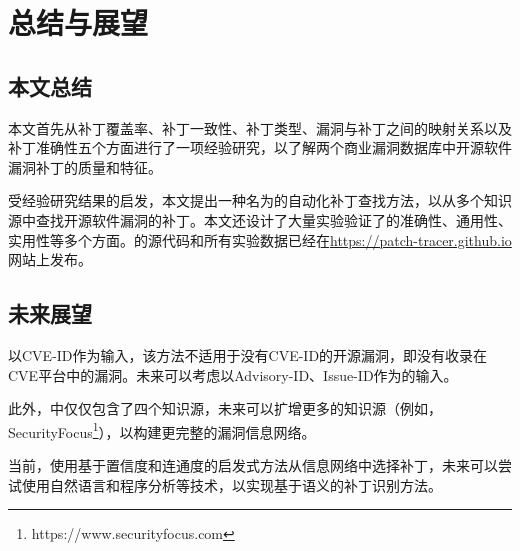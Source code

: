 \chapter{总结与展望}


\section{本文总结}
本文首先从补丁覆盖率、补丁一致性、补丁类型、漏洞与补丁之间的映射关系以及补丁准确性五个方面进行了一项经验研究，以了解两个商业漏洞数据库中开源软件漏洞补丁的质量和特征。

受经验研究结果的启发，本文提出一种名为\tool 的自动化补丁查找方法，以从多个知识源中查找开源软件漏洞的补丁。本文还设计了大量实验验证了\tool 的准确性、通用性、实用性等多个方面。\tool 的源代码和所有实验数据已经在\url{https://patch-tracer.github.io}网站上发布。

\section{未来展望}

\tool 以CVE-ID作为输入，该方法不适用于没有CVE-ID的开源漏洞，即没有收录在CVE平台中的漏洞。未来可以考虑以Advisory-ID、Issue-ID作为\tool 的输入。

此外，\tool 中仅仅包含了四个知识源，未来可以扩增更多的知识源（例如，SecurityFocus\footnote{https://www.securityfocus.com}），以构建更完整的漏洞信息网络。

当前，\tool 使用基于置信度和连通度的启发式方法从信息网络中选择补丁，未来可以尝试使用自然语言和程序分析等技术，以实现基于语义的补丁识别方法。
